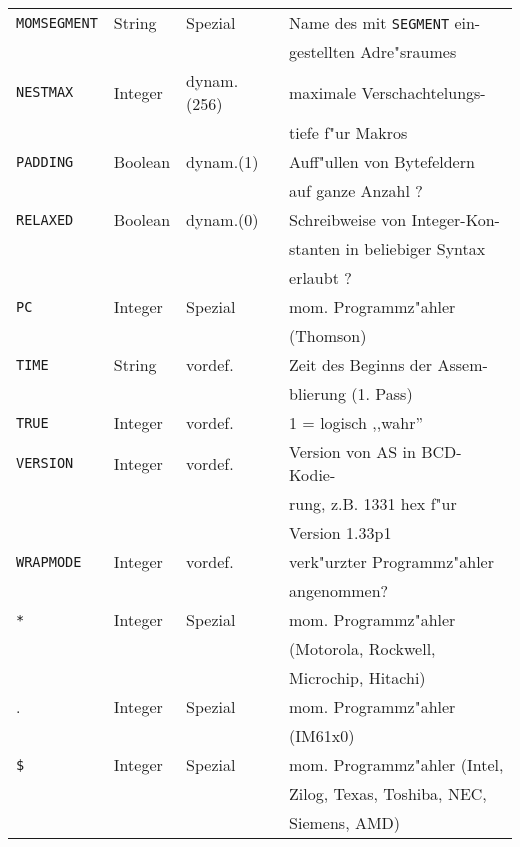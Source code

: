 \documentclass[12pt,a4paper,twoside]{report}
\newcommand{\tty}[1]{{\tt #1}}
\begin{document}
\begin{center}
\begin{longtable}{|l|l|l|l|}
\hline
\tty{MOMSEGMENT} &  String     & Spezial    & Name des mit \tty{SEGMENT} ein- \\
                 &             &            & gestellten Adre"sraumes \\
\hline
\tty{NESTMAX}    &  Integer    & dynam.(256)& maximale Verschachtelungs- \\
                 &             &            & tiefe f"ur Makros \\
\hline
\tty{PADDING}    &  Boolean    & dynam.(1)  & Auff"ullen von Bytefeldern \\
                 &             &            & auf ganze Anzahl ? \\
\hline
\tty{RELAXED}    &  Boolean    & dynam.(0)  & Schreibweise von Integer-Kon- \\
                 &             &            & stanten in beliebiger Syntax \\
                 &             &            & erlaubt ? \\
\hline
\tty{PC}         &  Integer    & Spezial    & mom. Programmz"ahler \\
                 &             &            & (Thomson) \\
\hline
\tty{TIME}       &  String     & vordef.    & Zeit des Beginns der Assem- \\
                 &             &            & blierung (1. Pass) \\
\hline
\tty{TRUE}       &  Integer    & vordef.    & 1 = logisch ,,wahr'' \\
\hline
\tty{VERSION}    &  Integer    & vordef.    & Version von AS in BCD-Kodie- \\
                 &             &            & rung, z.B. 1331 hex f"ur \\
                 &             &            & Version 1.33p1 \\
\hline
\tty{WRAPMODE}   &  Integer    & vordef.    & verk"urzter Programmz"ahler \\
                 &             &            & angenommen? \\
\hline
\verb!*!         &  Integer    & Spezial    & mom. Programmz"ahler \\
                 &             &            & (Motorola, Rockwell, \\
                 &             &            & Microchip, Hitachi) \\
\hline
.                &  Integer    & Spezial    & mom. Programmz"ahler \\
                 &             &            & (IM61x0) \\
\hline
\tty{\$}         &  Integer    & Spezial    & mom. Programmz"ahler (Intel, \\
                 &             &            & Zilog, Texas, Toshiba, NEC, \\
                 &             &            & Siemens, AMD) \\
\hline
\end{longtable}\end{center}
\end{document}
